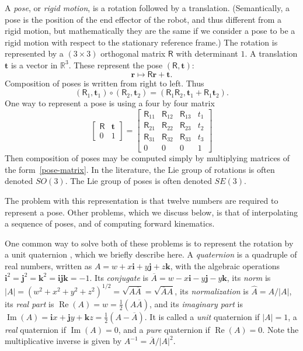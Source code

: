 \documentclass[reqno,12pt]{amsart}
\newcommand\bi{\bm i}
\newcommand\bj{\bm j}
\newcommand\bk{\bm k}
\DeclareMathOperator\realpart{Re}
\DeclareMathOperator\imagpart{Im}
\begin{document}
A \emph{pose}, or \emph{rigid motion}, is a rotation followed by a translation.  (Semantically, a pose is the position of the end effector of the robot, and thus different from a rigid motion, but mathematically they are the same if we consider a pose to be a rigid motion with respect to the stationary reference frame.)  The rotation is represented by a $(3 \times 3)$ orthogonal matrix $\mathsf R$ with determinant $1$.  A translation $\bm t$ is a vector in $\mathbb R^3$.  These represent the pose $(\mathsf R, \bm t)$:
\begin{equation}
\label{pose action}
\bm r \mapsto \mathsf R \bm r + \bm t .
\end{equation}
Composition of poses is written from right to left.  Thus
\begin{equation}
(\mathsf R_1, \bm t_1) \circ (\mathsf R_2, \bm t_2) = (\mathsf R_1 \mathsf R_2, \bm t_1 + \mathsf R_1 \bm t_2).
\end{equation}
One way to represent a pose is using a four by four matrix
\begin{equation}
\label{pose-matrix}
\begin{bmatrix} \mathsf R & \bm t \\ 0 & 1 \end{bmatrix}
 = \begin{bmatrix} \mathsf R_{11} & \mathsf R_{12} & \mathsf R_{13} & t_1 \\
                   \mathsf R_{21} & \mathsf R_{22} & \mathsf R_{23} & t_2 \\
                   \mathsf R_{31} & \mathsf R_{32} & \mathsf R_{33} & t_3 \\
                   0 & 0 & 0 & 1 \end{bmatrix} 
\end{equation}
Then composition of poses may be computed simply by multiplying matrices of the form~\eqref{pose-matrix}.  In the literature, the Lie group of rotations is often denoted $SO(3)$.  The Lie group of poses is often denoted $SE(3)$.

The problem with this representation is that twelve numbers are required to represent a pose.  Other problems, which we discuss below, is that of interpolating a sequence of poses, and of computing forward kinematics.

One common way to solve both of these problems is to represent the rotation by a unit quaternion \cite{quaternions1,quaternions2}, which we briefly describe here.  A \emph{quaternion} is a quadruple of real numbers, written as $A = w + x \bi + y \bj + z \bk$, with the algebraic operations $\bi^2 = \bj^2 = \bk^2 = \bi \bj \bk = -1$.  Its \emph{conjugate} is $\overline A = w - x \bi - y \bj - y \bk$, its \emph{norm} is $|A| = (w^2+x^2+y^2+z^2)^{1/2} = \sqrt{A \overline A} = \sqrt{\overline A A}$, its \emph{normalization} is $\widehat A = A/|A|$, its \emph{real part} is $\realpart(A) = w = \tfrac12(A \overline A)$, and its \emph{imaginary part} is $\imagpart(A) = \bi x + \bj y + \bk z = \tfrac12(A - \overline A)$.  It is called a \emph{unit} quaternion if $|A| = 1$, a \emph{real} quaternion if $\imagpart(A) = 0$, and a \emph{pure} quaternion if $\realpart(A) = 0$.  Note the multiplicative inverse is given by $A^{-1} = \overline A/|A|^2$.
\end{document}
